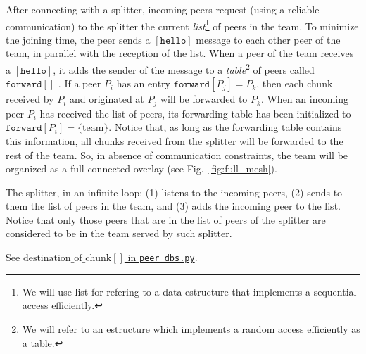 
\label{sec:joining}

After connecting with a splitter, incoming peers request (using a
reliable communication) to the splitter the current
\emph{list}\footnote{We will use list for refering to a data
  estructure that implements a sequential access efficiently.} of
peers in the team. To minimize the joining time, the peer sends a
$[\mathtt{hello}]$ message to each other peer of the team, in parallel
with the reception of the list. When a peer of the team receives a
$[\mathtt{hello}]$, it adds the sender of the message to a
\emph{table}\footnote{We will refer to an estructure which implements
  a random access efficiently as a table.} of peers called
$\mathtt{forward}[]$ . If a peer $P_i$ has an entry
$\mathtt{forward}[P_j]=P_k$, then each chunk received by $P_i$ and
originated at $P_j$ will be forwarded to $P_k$. When an incoming peer
$P_i$ has received the list of peers, its forwarding table has been
initialized to $\mathtt{forward}[P_i]=\{\text{team}\}$. Notice that,
as long as the forwarding table contains this information, all chunks
received from the splitter will be forwarded to the rest of the
team. So, in absence of communication constraints, the team will be
organized as a full-connected overlay (see Fig.~\ref{fig:full_mesh}).


The splitter, in an infinite loop: (1) listens to the incoming peers,
(2) sends to them the list of peers in the team, and (3) adds the
incoming peer to the list. Notice that only those peers that are in
the list of peers of the splitter are considered to be in the team
served by such splitter.


\begin{comment}
\begin{figure*}
  \fig{1000}{10cm}{joining} \caption{Code related to team
    joining.\label{fig:joining}}
\end{figure*}

The new pseudo-code related to joining a team is describen in the
Fig.~\ref{fig:joining}.
\end{comment}

\begin{notex}
  See \href{https://github.com/P2PSP/simulator/blob/f0c73be1817e7d3b816cc61cd2c8e59b17f9a0e6/src/core/splitter_dbs.py#L296}{$\text{destination\_of\_chunk}[]$ in \texttt{peer\_dbs.py}}.
\end{notex}
